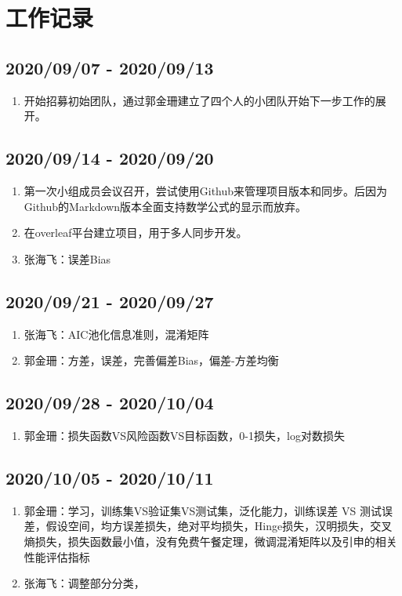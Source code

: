 \documentclass[a4paper,12pt]{article}
\begin{document}
\section{工作记录}
\subsection{2020/09/07 - 2020/09/13}
\begin{enumerate}
    \item 开始招募初始团队，通过郭金珊建立了四个人的小团队开始下一步工作的展开。
\end{enumerate}

\subsection{2020/09/14 - 2020/09/20}
\begin{enumerate}
    \item 第一次小组成员会议召开，尝试使用Github来管理项目版本和同步。后因为Github的Markdown版本全面支持数学公式的显示而放弃。
    \item 在overleaf平台建立项目，用于多人同步开发。
    \item 张海飞：误差Bias
   
\end{enumerate}

\subsection{2020/09/21 - 2020/09/27}
\begin{enumerate}
    \item 张海飞：AIC池化信息准则，混淆矩阵
    \item 郭金珊：方差，误差，完善偏差Bias，偏差-方差均衡
\end{enumerate}

\subsection{2020/09/28 - 2020/10/04}
\begin{enumerate}
    \item 郭金珊：损失函数VS风险函数VS目标函数，0-1损失，log对数损失
\end{enumerate}

\subsection{2020/10/05 - 2020/10/11}
\begin{enumerate}
    \item 郭金珊：学习，训练集VS验证集VS测试集，泛化能力，训练误差 VS 测试误差，假设空间，均方误差损失，绝对平均损失，Hinge损失，汉明损失，交叉熵损失，损失函数最小值，没有免费午餐定理，微调混淆矩阵以及引申的相关性能评估指标
    
    \item 张海飞：调整部分分类，
\end{enumerate}
\end{document}
